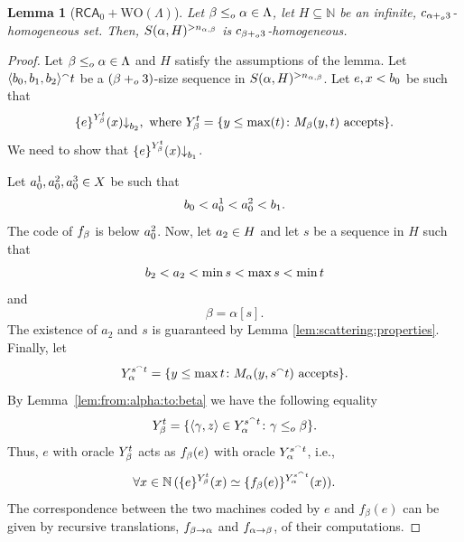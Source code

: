 \documentclass[11pt]{amsart}
\newtheorem{lemma}[thm]{Lemma}
\theoremstyle{definition}
\theoremstyle{remark}
\theoremstyle{plain}
\def\la{\langle}
\def\ra{\rangle}
\newcommand{\numberset}{\mathbb}
\newcommand{\N}{\numberset{N}}
\def\a{\alpha}
\def\b{\beta}
\def\conc{{}^\smallfrown}
\newcommand{\RCA}{\mathsf{RCA}_0}
\newcommand{\set}[1]{{\{{#1}\}}}
\def\stops{{\downarrow}}
\def\WO{{\textrm{WO}}}
\newcommand{\leqo}{\leq\sb{o}}
\newcommand{\pluso}{+\sb{o}}
\def\N{{\mathbb{N}}}
\def\stops{{\downarrow}}
\newcommand{\homo}{homogeneous}
\newcommand{\lorenzo}[1]{\textcolor{blue}{#1}}
\newcommand{\andrea}[1]{\textcolor{green}{#1}}
\begin{document}

\begin{lemma}[$\RCA+\WO(\Lambda)$]\label{lem:coloring:monotonicity} 
Let $\beta\leqo\alpha\in\Lambda$, let $H\subseteq\N$ be an infinite, $c\sb{\alpha \pluso3}$-homogeneous set. 
Then, $S(\alpha,H)\sp{>n_{\a,\b}}$ is $c\sb{\beta\pluso3}$-\homo.
\end{lemma}

\begin{proof}

Let $\beta\leqo\alpha\in\Lambda$ and $H$ satisfy the assumptions of the lemma.
Let $\la b\sb0,b\sb1,b\sb 2\ra \conc t$ be a $(\beta \pluso 3)$-size sequence in $S(\alpha,H)\sp{>n_{\a,\b}}$. 
Let $e,x<b\sb 0$ be such that 
$$
\set{e}\sp{Y\sb \beta \sp t}(x)\stops\sb{b\sb 2},
\mbox{ where } 
Y\sb \beta \sp t=\set{ y\leq \max(t) \colon M\sb \beta(y,t)\mbox{ accepts}}.
$$
We need to show that $\set{e}\sp{Y\sb \beta \sp t}(x)\stops\sb{b\sb 1}$.

Let $a\sp{1}\sb0,a\sp{2}\sb0, a\sp{3}\sb0\in X$ be such that 
$$
b\sb0<a\sp{1}\sb0<a\sp{2}\sb0 < b\sb 1.
$$
The code of $f\sb{\beta}$ is below $a\sp{2}\sb0$.
Now, let $a\sb 2\in H$ and let $s$ be a sequence in $H$ such that 
$$
b\sb 2<a\sb 2<\min s <\max s <\min t 
$$ and 
$$
\beta=\alpha[s].
$$
The existence of $a_2$ and $s$ is guaranteed by Lemma \ref{lem:scattering:properties}.
Finally, let
$$
Y\sb \alpha \sp {s\conc t} =\set{ y \leq \max t \colon M\sb \alpha(y,s \conc t)\mbox{ accepts}}.
$$
By Lemma~\ref{lem:from:alpha:to:beta} we have the following equality
\begin{equation}\label{eq:Yb:Ya}
Y\sb \beta \sp t = \set{\langle \gamma,z\rangle\in  Y\sb \alpha \sp {s \conc t}\colon \gamma\leqo \beta}.
\end{equation}
Thus, $e$ with oracle $Y\sb\beta \sp t$ acts as $f\sb\beta(e)$ with oracle $Y\sb\alpha \sp {s \conc t}$, i.e., 
$$\forall x \in\N \, (\{e\}^{Y\sb\beta\sp t}(x) \simeq \{f_\beta(e)\}^{Y\sb\alpha\sp {s \conc t}}(x)).$$
The correspondence between the two machines coded by $e$ and $f_\beta(e)$ can be given by recursive translations, $f\sb{\beta \rightarrow \alpha}$ and $f\sb{\alpha \rightarrow \beta}$, of their computations.


\end{proof}
\end{document}
